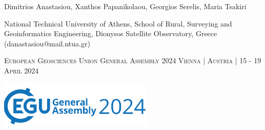 \documentclass[landscape,a0paper,fontscale=0.346]{baposter} %
\begin{document}
\begin{poster}
{\large Dimitrios Anastasiou, Xanthos Papanikolaou, Georgios Serelis, Maria Tsakiri 
{\small \par{National Technical University of Athens, School of Rural, Surveying and Geoinformatics Engineering, Dionysos Satellite Observatory, Greece (danastasiou@mail.ntua.gr)} 
} \vspace{0.3em}
\par{\textsc{European Geosciences Union General Assembly 2024 Vienna | Austria | 15 - 19 April 2024}} 
\vskip 0.2cm

 }
{\includegraphics[height=6em]{../../logos/egu24_logo.png}} %




\end{poster}
\end{document}

